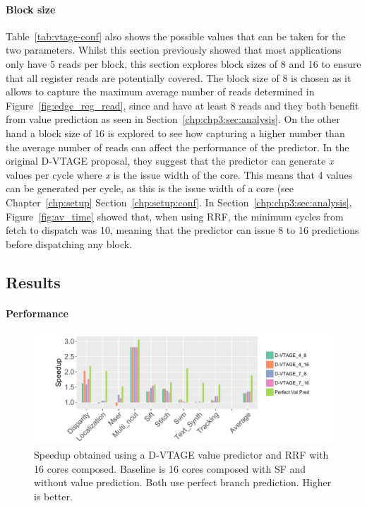\paragraph*{Block size}
Table~\ref{tab:vtage-conf} also shows the possible values that can be taken for the two parameters.
Whilst this section previously showed that most applications only have 5 reads per block, this section explores block sizes of 8 and 16 to ensure that all register reads are potentially covered. 
The block size of 8 is chosen as it allows to capture the maximum average number of reads determined in Figure~\ref{fig:edge_reg_read}, since  and  have at least 8 reads and they both benefit from value prediction as seen in Section~\ref{chp:chp3:sec:analysis}.
On the other hand a block size of 16 is explored to see how capturing a higher number than the average number of reads can affect the performance of the predictor. 
In the original D-VTAGE proposal, they suggest that the predictor can generate \textit{x} values per cycle where \textit{x} is the issue width of the core.
This means that 4 values can be generated per cycle, as this is the issue width of a core (see Chapter~\ref{chp:setup} Section~\ref{chp:setup:conf}.
In Section~\ref{chp:chp3:sec:analysis}, Figure~\ref{fig:av_time} showed that, when using RRF, the minimum cycles from fetch to dispatch was 10, meaning that the predictor can issue 8 to 16 predictions before dispatching any block.


\subsection{Results}

\paragraph*{Performance}

\begin{figure}[t]
    \centering
    \includegraphics[width=1\textwidth]{chapter3/graphics/vtage_speed2.pdf}
    \caption{Speedup obtained using a D-VTAGE value predictor and RRF with 16 cores composed. Baseline is 16 cores composed with SF and without value prediction. Both use perfect branch prediction. Higher is better.}
    \label{fig:vtage_perf}
	\vspace{1em}
\end{figure}

